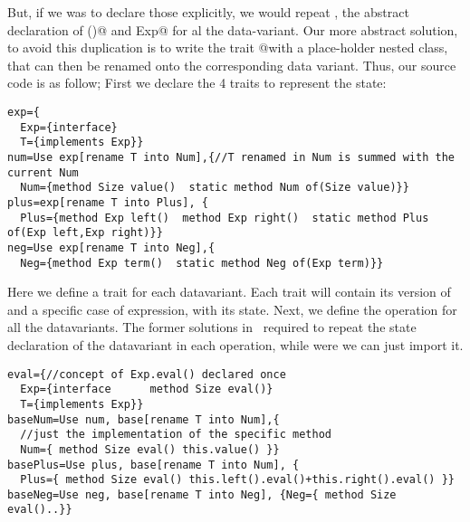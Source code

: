 But, if we was to declare those
explicitly, we would repeat \Q@Exp@, the abstract
declaration of \Q@eval()@ and \Q@implements Exp@
for al the data-variant.
Our more abstract solution, to avoid this duplication is to write 
the trait \Q@eval @with a place-holder \Q@T@ nested class, that can then be renamed
onto the corresponding data variant.
Thus, our source code is as follow;
First we declare the 4 traits to represent the state:
\begin{lstlisting}
exp={
  Exp={interface}
  T={implements Exp}}
num=Use exp[rename T into Num],{//T renamed in Num is summed with the current Num
  Num={method Size value()  static method Num of(Size value)}}
plus=exp[rename T into Plus], {
  Plus={method Exp left()  method Exp right()  static method Plus of(Exp left,Exp right)}}
neg=Use exp[rename T into Neg],{
  Neg={method Exp term()  static method Neg of(Exp term)}}
\end{lstlisting}
Here we define a trait for each datavariant.
Each trait will contain its version of \Q@Exp@
and a specific case of expression, with its state.
Next, we define the operation \Q@eval@ for all the datavariants.
The former solutions in~\cite{deepfjig}
required to repeat the state declaration of the 
datavariant in each operation, while were we can just import it.

\begin{lstlisting}
eval={//concept of Exp.eval() declared once
  Exp={interface      method Size eval()}
  T={implements Exp}}
baseNum=Use num, base[rename T into Num],{
  //just the implementation of the specific method
  Num={ method Size eval() this.value() }}
basePlus=Use plus, base[rename T into Num], {
  Plus={ method Size eval() this.left().eval()+this.right().eval() }}
baseNeg=Use neg, base[rename T into Neg], {Neg={ method Size eval()..}}
\end{lstlisting}

